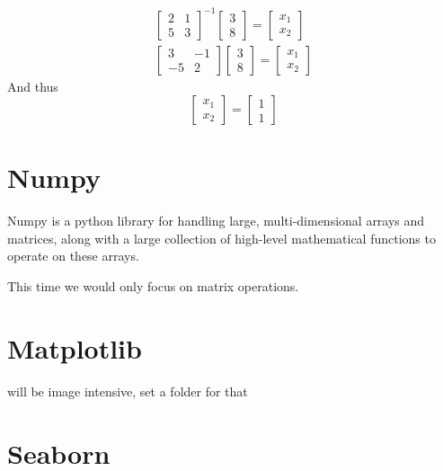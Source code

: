 \begin{equation}
	\begin{aligned}
	\begin{bmatrix}
		2&1\\
		5&3
	\end{bmatrix}^{-1}
	\begin{bmatrix}
		3\\
		8 
	\end{bmatrix}
	=
	\begin{bmatrix}
	x_1\\
	x_2 
	\end{bmatrix}\\
	\begin{bmatrix}
		3&-1\\
		-5&2
	\end{bmatrix}
	\begin{bmatrix}
		3\\
		8 
	\end{bmatrix}
	=
	\begin{bmatrix}
		x_1\\
		x_2 
	\end{bmatrix}
	\end{aligned}
\end{equation}
\noindent And thus
\begin{equation}
	\begin{bmatrix}
		x_1\\
		x_2 
	\end{bmatrix}
	=
	\begin{bmatrix}
		1\\
		1 
	\end{bmatrix}
\end{equation}
\section{Numpy}
Numpy is a python library for handling large, multi-dimensional arrays and matrices, along with a large collection of high-level mathematical functions to operate on these arrays.

This time we would only focus on matrix operations.
\section{Matplotlib}
will be image intensive, set a folder for that
\section{Seaborn}